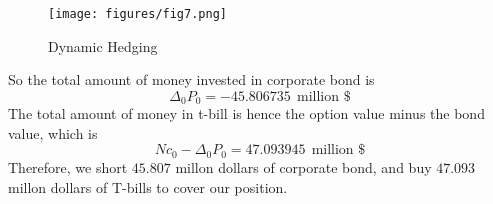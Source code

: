 \documentclass[10 pt]{hwtemplate} %
\begin{document}
\begin{solution}
\begin{figure}[H]
  \caption{Dynamic Hedging}
  \texttt{[image: figures/fig7.png]}
\end{figure}
So the total amount of money invested in corporate bond is
\begin{equation}
  \Delta_0 P_0 = -45.806735 ~~\text{million \$}
\end{equation}
The total amount of money in t-bill is hence the option value minus the bond value, which is
\begin{equation}
  Nc_0 - \Delta_0 P_0 = 47.093945 ~~\text{million \$}
\end{equation}
Therefore, we short $45.807$ millon dollars of corporate bond, and buy $47.093$ millon dollars of T-bills to cover our position.
\end{solution}
\end{document}
